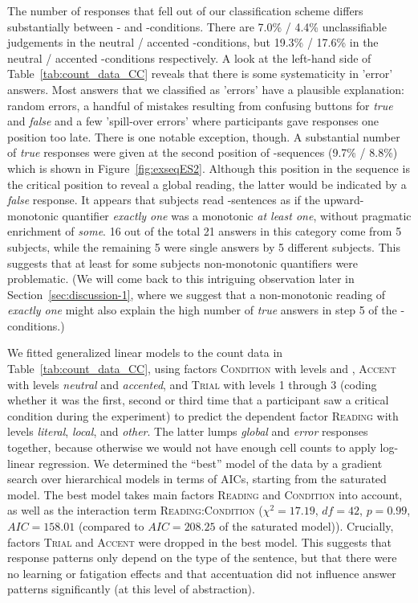 \documentclass[fleqn,reqno,10pt]{article}
\newcommand{\as}{\acro{as}}
\renewcommand{\es}{\acro{es}}
\begin{document}
The number of responses that fell out of our classification scheme
differs substantially between \as- and \es-conditions. There are 7.0\%
/ 4.4\% unclassifiable judgements in the neutral / accented
\as-conditions, but 19.3\% / 17.6\% in the neutral / accented
\es-conditions respectively. A look at the left-hand side of
Table~\ref{tab:count_data_CC} reveals that there is some systematicity
in 'error' answers. Most answers that we classified as 'errors' have a
plausible explanation: random errors, a handful of mistakes resulting
from confusing buttons for \emph{true} and \emph{false} and a few
'spill-over errors' where participants gave responses one position too
late. There is one notable exception, though. A substantial number of
\emph{true} responses were given at the second position of
\es-sequences (9.7\% / 8.8\%) which is shown in
Figure~\ref{fig:exseqES2}. Although this position in the sequence is
the critical position to reveal a global reading, the latter would be
indicated by a \emph{false} response. It appears that subjects read
\es-sentences as if the upward-monotonic quantifier \emph{exactly one}
was a monotonic \emph{at least one}, without pragmatic enrichment of
\emph{some}. 16 out of the total 21 answers in this category come from
5 subjects, while the remaining 5 were single answers by 5 different
subjects.
This suggests that at least for some subjects non-monotonic
quantifiers were problematic. (We will come back to this intriguing
observation later in Section~\ref{sec:discussion-1}, where we suggest
that a non-monotonic reading of \emph{exactly one} might also explain
the high number of \emph{true} answers in step 5 of the
\es-conditions.)

We fitted generalized linear models to the count data in
Table~\ref{tab:count_data_CC}, using factors \textsc{Condition} with
levels \as and \es, \textsc{Accent} with levels \emph{neutral} and
\emph{accented}, and \textsc{Trial} with levels 1 through 3 (coding
whether it was the first, second or third time that a participant saw
a critical condition during the experiment) to predict the dependent
factor \textsc{Reading} with levels \emph{literal}, \emph{local}, and
\emph{other}. The latter lumps \emph{global} and \emph{error}
responses together, because otherwise we would not have enough cell
counts to apply log-linear regression. We determined the ``best''
model of the data by a gradient search over hierarchical models in
terms of AICs, starting from the saturated model. The best model takes
main factors \textsc{Reading} and \textsc{Condition} into account, as
well as the interaction term \textsc{Reading:Condition} ($\chi^2 =
17.19$, $df=42$, $p = 0.99$, $AIC = 158.01$ (compared to $AIC=208.25$
of the saturated model)). Crucially, factors \textsc{Trial} and
\textsc{Accent} were dropped in the best model. This suggests that
response patterns only depend on the type of the sentence, but that
there were no learning or fatigation effects and that accentuation did
not influence answer patterns significantly (at this level of
abstraction).
\end{document}
